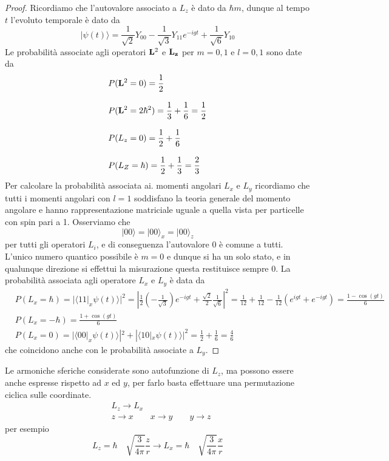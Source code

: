 \begin{proof}
Ricordiamo che l'autovalore associato a $L_z$ \`e dato da $\hbar m$, dunque al tempo $t$ l'evoluto temporale \`e dato da 
\begin{equation*}
	|\psi(t) \rangle = \frac{1}{\sqrt{2}}Y_{00} - \frac{1}{\sqrt{3}}Y_{11}e^{-igt} + \frac{1}{\sqrt{6}}Y_{10}
\end{equation*}
Le probabilit\`a associate agli operatori $\bold{L}^2$ e $\bold{L_z}$ per $m = 0,1$ e $l = 0,1$ sono date da 
\begin{align*}
	& P(\bold{L}^2 = 0) = \frac{1}{2} \\[0.3cm]
	& P(\bold{L}^2 = 2 \hbar^2)  = \frac{1}{3} + \frac{1}{6} = \frac{1}{2}\\[0.3cm]
	& P(L_z = 0) = \frac{1}{2} + \frac{1}{6}\\[0.3cm]
	& P(L_Z = \hbar ) = \frac{1}{2} + \frac{1}{3} = \frac{2}{3}  
\end{align*}	
Per calcolare la probabilit\`a associata ai. momenti angolari $L_x$ e $L_y$ ricordiamo che tutti i momenti angolari con $l =1$ soddisfano la teoria generale del momento angolare e hanno rappresentazione matriciale uguale a quella vista per particelle con spin pari a 1. Osserviamo che 
\begin{equation*}
	|00 \rangle = |00 \rangle_x = |00\rangle_z 
\end{equation*}
per tutti gli operatori $L_i$, e di conseguenza l'autovalore $0$ \`e comune a tutti.  L'unico numero quantico possibile \`e $m =0$ e dunque si ha un solo stato, e in qualunque direzione si effettui la misurazione questa restituisce sempre $0$. La probabilit\`a associata agli operatore $L_x$ e $L_y$ \`e data da 
\begin{align*}
	& P(L_x = \hbar) = |\langle 11 |_x \psi(t) \rangle |^2 = \left | \frac{1}{2} \left ( - \frac{1}{\sqrt{3}}\right) e^{-igt} + \frac{\sqrt{2}}{2} \frac{1}{\sqrt{6}}\right |^2 = \frac{1}{12} + \frac{1}{12} - \frac{1}{12} (e^{igt} + e^{-igt}) = \frac{1- \cos(gt)}{6}\\[0.3cm]
	& P(L_x = -\hbar) = \frac{1+\cos(gt)}{6}\\[0.3cm]
	& P(L_x = 0 ) = |\langle 00|_x \psi(t) \rangle |^2  +|\langle 10|_x \psi(t) \rangle |^2 =  \frac{1}{2} + \frac{1}{6} = \frac{4}{6}
\end{align*}
che coincidono anche con le probabilit\`a associate a $L_y$.

\end{proof}

\newpage 

Le armoniche sferiche considerate sono autofunzione di $L_z$, ma possono essere anche espresse rispetto ad $x$ ed $y$, per farlo basta effettuare una permutazione ciclica sulle coordinate.
\begin{align*}
 &L_z \longrightarrow L_x \\[0.3cm]
 &z \to x \quad \quad x \to y \quad \quad y \to z 
\end{align*}
per esempio 
\begin{equation*}
	L_z = \hbar \quad \sqrt{\frac{3}{4 \pi}} \frac{z}{r} \longrightarrow L_x = \hbar \quad \sqrt{\frac{3}{4 \pi}}\frac{x}{r}
\end{equation*}

